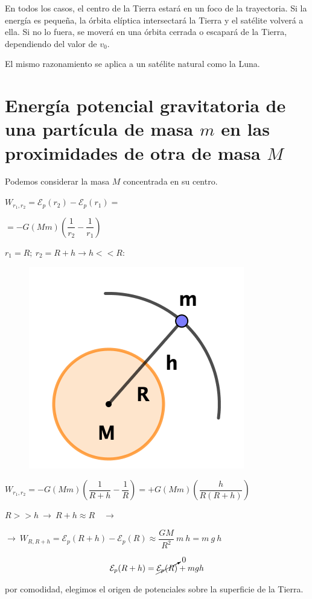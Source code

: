 En todos los casos, el centro de la Tierra estará en un foco de la trayectoria. Si la energía es pequeña, la órbita elíptica intersectará la Tierra y el satélite volverá a ella. Si no lo fuera, se moverá en una órbita cerrada o escapará de la Tierra, dependiendo del valor de $v_0$.

El mismo razonamiento se aplica a un satélite natural como la Luna.

\section[Energía potencial gravitatoria de una partícula de masa $m$ en las proximidades de otra de masa $M$]{Energía potencial gravitatoria de una partícula de masa $m$ en las proximidades de otra de masa $M$}

\begin{multicols}{2}
Podemos considerar la masa $M$ concentrada en su centro.

$W_{r_1,r_2}=\mathcal E_{p}(r_2)-\mathcal E_{p}(r_1)=$

$=-G(Mm)\left( \dfrac 1 {r_2} - \dfrac 1 {r_1} \right)$

$r_1=R;\ r_2=R+h \to h<<R: $
\begin{figure}[H]
	\centering
	\includegraphics[width=.35\textwidth]{imagenes/imagenes15/T15IM03.png}
\end{figure}	
\end{multicols}

$W_{r_1,r_2}=-G(Mm)\left( \dfrac 1 {R+h} - \dfrac 1 {R} \right)= +G(Mm)\left( \dfrac{h}{R(R+h)} \right)$

$R>>h \ \to \ R+h \approx R \quad \to \ $

$\to \ W_{R,R+h}=\mathcal E_{p}(R+h)-\mathcal E_{p}(R)\approx \dfrac{GM}{R^2}\ m \ h=m\ g \ h$

$$\mathcal E_p(R+h)=\cancelto{0}{\mathcal E_p(R)}+mgh$$ 

por comodidad, elegimos el origen de potenciales sobre la superficie de la Tierra.
 
